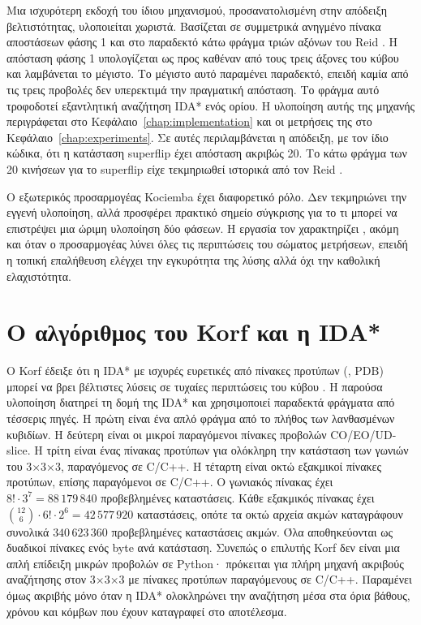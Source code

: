 Μια ισχυρότερη εκδοχή του ίδιου μηχανισμού, προσανατολισμένη στην απόδειξη βελτιστότητας, υλοποιείται χωριστά. Βασίζεται σε συμμετρικά ανηγμένο πίνακα αποστάσεων φάσης 1 και στο παραδεκτό κάτω φράγμα τριών αξόνων του Reid \cite{reid1997optimal}. Η απόσταση φάσης 1 υπολογίζεται ως προς καθέναν από τους τρεις άξονες του κύβου και λαμβάνεται το μέγιστο. Το μέγιστο αυτό παραμένει παραδεκτό, επειδή καμία από τις τρεις προβολές δεν υπερεκτιμά την πραγματική απόσταση. Το φράγμα αυτό τροφοδοτεί εξαντλητική αναζήτηση IDA* ενός ορίου. Η υλοποίηση αυτής της μηχανής περιγράφεται στο Κεφάλαιο~\ref{chap:implementation} και οι μετρήσεις της στο Κεφάλαιο~\ref{chap:experiments}. Σε αυτές περιλαμβάνεται η απόδειξη, με τον ίδιο κώδικα, ότι η κατάσταση superflip έχει απόσταση ακριβώς 20. Το κάτω φράγμα των 20 κινήσεων για το superflip είχε τεκμηριωθεί ιστορικά από τον Reid \cite{reid1995superflip}.

Ο εξωτερικός προσαρμογέας Kociemba έχει διαφορετικό ρόλο. Δεν τεκμηριώνει την εγγενή υλοποίηση, αλλά προσφέρει πρακτικό σημείο σύγκρισης για το τι μπορεί να επιστρέψει μια ώριμη υλοποίηση δύο φάσεων. Η εργασία τον χαρακτηρίζει , ακόμη και όταν ο προσαρμογέας λύνει όλες τις περιπτώσεις του σώματος μετρήσεων, επειδή η τοπική επαλήθευση ελέγχει την εγκυρότητα της λύσης αλλά όχι την καθολική ελαχιστότητα.

\section{Ο αλγόριθμος του Korf και η IDA*}
\label{sec:algorithms-korf}
Ο Korf έδειξε ότι η IDA* με ισχυρές ευρετικές από πίνακες προτύπων (, PDB) μπορεί να βρει βέλτιστες λύσεις σε τυχαίες περιπτώσεις του κύβου \cite{korf1997pattern}. Η παρούσα υλοποίηση διατηρεί τη δομή της IDA* και χρησιμοποιεί παραδεκτά φράγματα από τέσσερις πηγές. Η πρώτη είναι ένα απλό φράγμα από το πλήθος των λανθασμένων κυβιδίων. Η δεύτερη είναι οι μικροί παραγόμενοι πίνακες προβολών CO/EO/UD-slice. Η τρίτη είναι ένας πίνακας προτύπων για ολόκληρη την κατάσταση των γωνιών του 3×3×3, παραγόμενος σε C/C++. Η τέταρτη είναι οκτώ εξακμικοί πίνακες προτύπων, επίσης παραγόμενοι σε C/C++. Ο γωνιακός πίνακας έχει \(8!\cdot3^7=88\,179\,840\) προβεβλημένες καταστάσεις. Κάθε εξακμικός πίνακας έχει \(\binom{12}{6}\cdot6!\cdot2^6=42\,577\,920\) καταστάσεις, οπότε τα οκτώ αρχεία ακμών καταγράφουν συνολικά \(340\,623\,360\) προβεβλημένες καταστάσεις ακμών. Όλα αποθηκεύονται ως δυαδικοί πίνακες ενός byte ανά κατάσταση. Συνεπώς ο επιλυτής Korf δεν είναι μια απλή επίδειξη μικρών προβολών σε Python· πρόκειται για πλήρη μηχανή ακριβούς αναζήτησης στον 3×3×3 με πίνακες προτύπων παραγόμενους σε C/C++. Παραμένει όμως ακριβής μόνο όταν η IDA* ολοκληρώνει την αναζήτηση μέσα στα όρια βάθους, χρόνου και κόμβων που έχουν καταγραφεί στο αποτέλεσμα.

